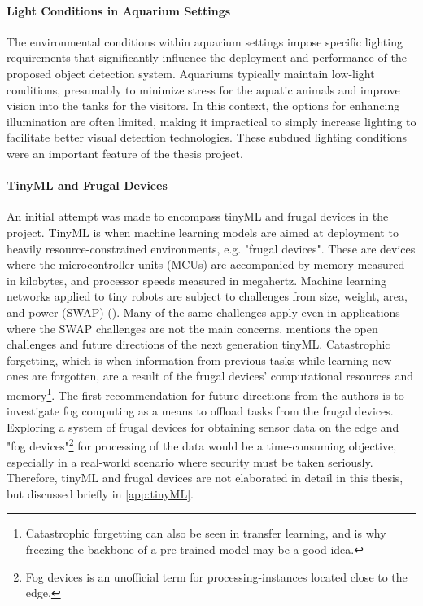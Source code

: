 \paragraph{Light Conditions in Aquarium Settings}
\label{sec:scope_aquarium_light}
The environmental conditions within aquarium settings impose specific lighting requirements that significantly influence the deployment and performance of the proposed object detection system. Aquariums typically maintain low-light conditions, presumably to minimize stress for the aquatic animals and improve vision into the tanks for the visitors. In this context, the options for enhancing illumination are often limited, making it impractical to simply increase lighting to facilitate better visual detection technologies. These subdued lighting conditions were an important feature of the thesis project.

\paragraph{TinyML and Frugal Devices}
\label{sec:scope_tinyML}
An initial attempt was made to encompass tinyML and frugal devices in the project. TinyML is when machine learning models are aimed at deployment to heavily resource-constrained environments, e.g. "frugal devices". These are devices where the microcontroller units (MCUs) are accompanied by memory measured in kilobytes, and processor speeds measured in megahertz. Machine learning networks applied to tiny robots are subject to challenges from size, weight, area, and power (SWAP) (\cite{ne2022robotstinymlconstraints}). Many of the same challenges apply even in applications where the SWAP challenges are not the main concerns. \citeauthor{ra2023reformabletinyml} mentions the open challenges and future directions of the next generation tinyML. Catastrophic forgetting, which is when information from previous tasks while learning new ones are forgotten, are a result of the frugal devices' computational resources and memory\footnote{Catastrophic forgetting can also be seen in transfer learning, and is why freezing the backbone of a pre-trained model may be a good idea.}. The first recommendation for future directions from the authors is to investigate fog computing as a means to offload tasks from the frugal devices. Exploring a system of frugal devices for obtaining sensor data on the edge and "fog devices"\footnote{Fog devices is an unofficial term for processing-instances located close to the edge.} for processing of the data would be a time-consuming objective, especially in a real-world scenario where security must be taken seriously. Therefore, tinyML and frugal devices are not elaborated in detail in this thesis, but discussed briefly in \ref{app:tinyML}. 

